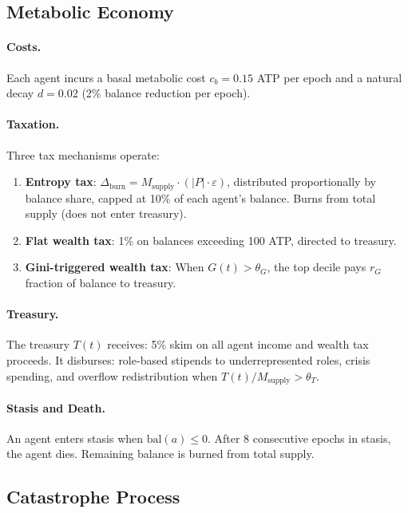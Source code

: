 \documentclass[11pt,a4paper]{article}
\begin{document}
\subsection{Metabolic Economy}

\paragraph{Costs.}
Each agent incurs a basal metabolic cost $c_b = 0.15$ ATP per epoch and a natural decay $d = 0.02$ (2\% balance reduction per epoch).

\paragraph{Taxation.}
Three tax mechanisms operate:
\begin{enumerate}[nosep]
  \item \textbf{Entropy tax}: $\Delta_{\text{burn}} = M_{\text{supply}} \cdot (|P| \cdot \varepsilon)$, distributed proportionally by balance share, capped at 10\% of each agent's balance. Burns from total supply (does not enter treasury).
  \item \textbf{Flat wealth tax}: 1\% on balances exceeding 100 ATP, directed to treasury.
  \item \textbf{Gini-triggered wealth tax}: When $G(t) > \theta_G$, the top decile pays $r_G$ fraction of balance to treasury.
\end{enumerate}

\paragraph{Treasury.}
The treasury $T(t)$ receives: 5\% skim on all agent income and wealth tax proceeds. It disburses: role-based stipends to underrepresented roles, crisis spending, and overflow redistribution when $T(t) / M_{\text{supply}} > \theta_T$.

\paragraph{Stasis and Death.}
An agent enters stasis when $\text{bal}(a) \leq 0$. After 8 consecutive epochs in stasis, the agent dies. Remaining balance is burned from total supply.

\subsection{Catastrophe Process}
\end{document}
